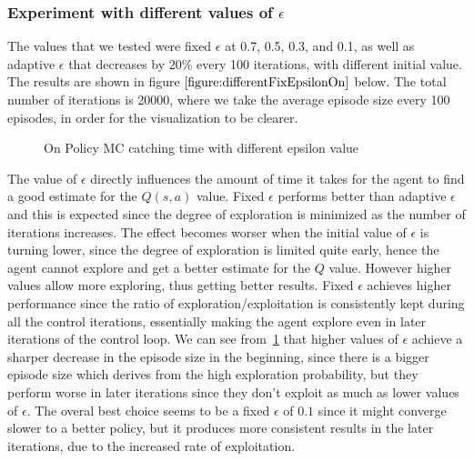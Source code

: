 \documentclass[paper=a4, fontsize=11pt]{scrartcl}
\numberwithin{equation}{section}		%
\numberwithin{figure}{section}			%
\numberwithin{table}{section}				%
\begin{document}
\subsubsection*{Experiment with different values of $\epsilon$}
The values that we tested were fixed $\epsilon$ at 0.7, 0.5, 0.3, and 0.1, as well as adaptive $\epsilon$ that decreases by $20\%$ every 100 iterations, with different initial value. The results are shown in figure $\ref{figure:differentFixEpsilonOn}$ below. The total number of iterations is  20000, where we take the average episode size every 100 episodes, in order for the visualization to be clearer. 
\begin{figure}[h] \centering
\caption{On Policy MC catching time with different epsilon value} \label{figure:differentFixEpsilonOn}
\end{figure}
The value of $\epsilon$ directly influences the amount of time it takes for the agent to find a good estimate for the $Q(s,a)$ value. Fixed $\epsilon$ performs better than adaptive $\epsilon$ and this is expected since the degree of exploration is minimized as the number of iterations increases. The effect becomes worser when the initial value of $\epsilon$ is turning lower, since the degree of exploration is limited quite early, hence the agent cannot explore and get a better estimate for the $Q$ value. However higher values allow more exploring, thus getting better results. Fixed $\epsilon$ achieves higher performance since the ratio of exploration/exploitation is consistently kept during all the control iterations, essentially making the agent explore even in later iterations of the control loop.  We can see from~\ref{figure:differentFixEpsilonOn} that higher  values of $\epsilon$ achieve a sharper decrease in the episode size in the beginning, since there is a bigger episode size which derives from the high exploration probability, but they perform worse in later iterations since they don't exploit as much as lower values of $\epsilon$. The overal best choice seems to be a fixed $\epsilon$ of $0.1$ since it might converge slower to a better policy, but it produces more consistent results in the later iterations, due to the increased rate of exploitation. 
\end{document}
